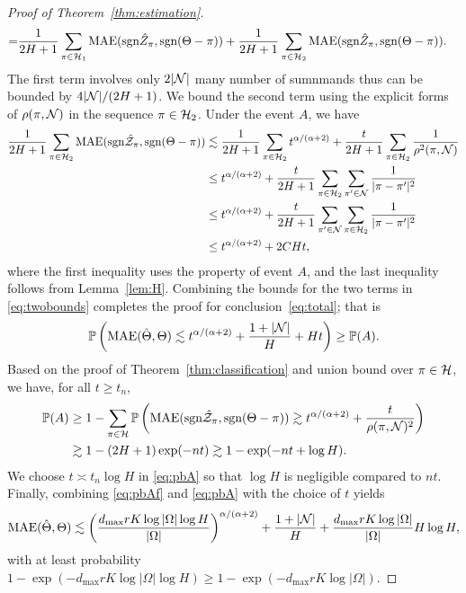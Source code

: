 \documentclass[11pt]{article}
\theoremstyle{plain}
\theoremstyle{definition}
\def\sign{\textup{sgn}}
\begin{document}
\begin{proof}[Proof of Theorem~\ref{thm:estimation}]
\begin{align}
=&{1\over 2H+1}\sum_{\pi \in\tH_1} \textup{MAE}(\sign \hat Z_\pi, \sign (\Theta-\pi))+{1\over 2H+1}\sum_{\pi \in  \tH_2} \textup{MAE}(\sign \hat Z_\pi, \sign (\Theta-\pi)).
\end{align}
The first term involves only $2|\mathcal{N}|$ many number of sumnmands thus can be bounded by $4|\mathcal{N}|/(2H+1)$.
 We bound the second term using the explicit forms of $\rho(\pi, \mathcal{N})$ in the sequence $\pi \in\mathcal{H}_2$. Under the event $A$, we have  
\begin{align}
{1\over 2H+1}\sum_{\pi \in \tH_2} \textup{MAE}(\sign \hat \tZ_\pi, \sign (\Theta-\pi)) &\lesssim  {1\over 2H+1}\sum_{\pi\in \tH_2} t^{\alpha/(\alpha+2)}+{t\over 2H+1}\sum_{\pi \in \tH_2}{1\over \rho^2(\pi, \tN)}\\
&\leq t^{\alpha/(\alpha+2)}+{t\over 2H+1} \sum_{\pi \in\tH_2} \sum_{\pi' \in \tN}{1\over |\pi-\pi'|^2}\\
&\leq  t^{\alpha/(\alpha+2)}+{t\over 2H+1} \sum_{\pi'\in \tN} \sum_{\pi \in \tH_2}{1\over |\pi-\pi'|^2}\\
&\leq t^{\alpha/(\alpha+2)}+ 2CHt,
\end{align}
where the first inequality uses the property of event $A$, and  the last inequality follows from Lemma~\ref{lem:H}.  Combining the bounds for the two terms in \eqref{eq:twobounds} completes the proof for conclusion~\eqref{eq:total}; that is 
\begin{align}\label{eq:pbAf}
\mathbb{P	}\left(\text{MAE}(\hat\Theta,\Theta)\lesssim t^{\alpha/(\alpha+2)}+\frac{1+|\mathcal{N}|}{H}+Ht\right)\geq \mathbb{P}(A).
\end{align} 
Based on the proof of Theorem~\ref{thm:classification} and union bound over $\pi\in\mathcal{H}$, we have, for all $t\geq t_n$,
\begin{align}\label{eq:pbA}
\mathbb{P}(A)&\geq 1-\sum_{\pi\in\tH} \mathbb{P}\left(\text{MAE}(\sign\hat \tZ_\pi,\sign(\Theta-\pi))\gtrsim t^{\alpha/(\alpha+2)}+\frac{t}{\rho(\pi,\tN)^2}\right)\nonumber\\
&\gtrsim 1-(2H+1)\exp(-nt)\gtrsim 1-\exp(-nt+\log H).
\end{align}
We choose $t\asymp t_n\log H$ in \eqref{eq:pbA} so that $\log H$ is negligible compared to $nt$.
Finally, combining \eqref{eq:pbAf} and \eqref{eq:pbA} with the choice of $t$  yields
\begin{align}
\text{MAE}(\hat\Theta,\Theta)\lesssim \left(d_{\max}rK\log |\Omega|\log H\over |\Omega|\right)^{\alpha/(\alpha+2)}+\frac{1+|\mathcal{N}|}{H}+{d_{\max}rK\log |\Omega|\over |\Omega|}H\log H,
 \end{align}
 with at least probability $1-\exp(-d_{\max}rK\log|\Omega|\log H)\geq 1-\exp(-d_{\max}rK\log|\Omega|)$.

\end{proof}
\end{document}
